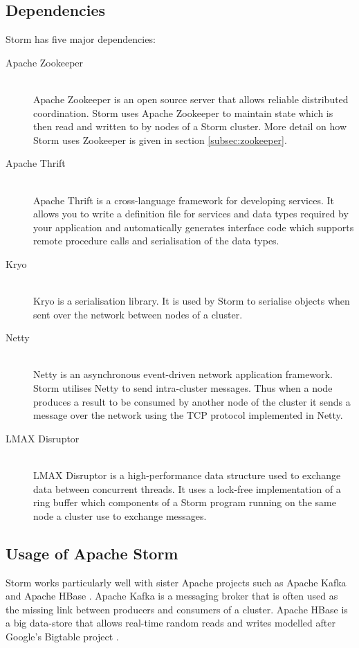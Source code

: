 \documentclass[bsc,logo,frontabs,twoside,singlespacing,normalheadings,parskip]{infthesis}\usepackage[]{graphicx}\usepackage[]{color}
\begin{document}
\subsection{Dependencies}

Storm has five major dependencies:

\begin{description}
	\item[Apache Zookeeper] \hfill \\
	Apache Zookeeper \citep{ApacheZookeeper} is an open source server that allows reliable distributed coordination. Storm uses Apache Zookeeper to maintain state which is then read and written to by nodes of a Storm cluster. More detail on how Storm uses Zookeeper is given in section \ref{subsec:zookeeper}.
	\item[Apache Thrift] \hfill \\
	Apache Thrift \citep{ApacheThrift} is a cross-language framework for developing services. It allows you to write a definition file for services and data types required by your application and automatically generates interface code which supports remote procedure calls and serialisation of the data types.
	\item[Kryo] \hfill \\
	Kryo \citep{EsotericKryo} is a serialisation library. It is used by Storm to serialise objects when sent over the network between nodes of a cluster.
	\item[Netty] \hfill \\
	Netty \citep{Netty} is an asynchronous event-driven network application framework. Storm utilises Netty to send intra-cluster messages. Thus when a node produces a result to be consumed by another node of the cluster it sends a message over the network using the TCP protocol implemented in Netty.
	\item[LMAX Disruptor] \hfill \\
	LMAX Disruptor \cite{LMAXDisruptor} is a high-performance data structure used to exchange data between concurrent threads. It uses a lock-free implementation of a ring buffer which components of a Storm program running on the same node a cluster use to exchange messages.
\end{description}

\subsection{Usage of Apache Storm}

Storm works particularly well with sister Apache projects such as Apache Kafka \cite{ApacheKafka} and Apache HBase \cite{ApacheHBase}. Apache Kafka is a messaging broker that is often used as the missing link between producers and consumers of a cluster. Apache HBase is a big data-store that allows real-time random reads and writes modelled after Google's Bigtable project \cite{Chang:2008:BDS:1365815.1365816}.
\end{document}
